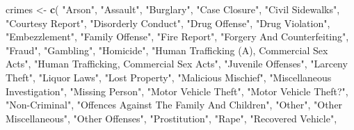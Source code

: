 \documentclass[
  12pt,
]{book}
\newenvironment{Shaded}{\begin{snugshade}}{\end{snugshade}}
\newcommand{\KeywordTok}[1]{\textcolor[rgb]{0.27,0.27,0.27}{\textbf{#1}}}
\newcommand{\NormalTok}[1]{#1}
\newcommand{\StringTok}[1]{\textcolor[rgb]{0.5,0.5,0.5}{#1}}
\begin{document}
\begin{Shaded}
\begin{Highlighting}[]
\NormalTok{crimes <{-}}\StringTok{ }\KeywordTok{c}\NormalTok{(}
  \StringTok{"Arson"}\NormalTok{,}
  \StringTok{"Assault"}\NormalTok{,                                  }
  \StringTok{"Burglary"}\NormalTok{,                                 }
  \StringTok{"Case Closure"}\NormalTok{,                             }
  \StringTok{"Civil Sidewalks"}\NormalTok{,                          }
  \StringTok{"Courtesy Report"}\NormalTok{,                          }
  \StringTok{"Disorderly Conduct"}\NormalTok{,                       }
  \StringTok{"Drug Offense"}\NormalTok{,                             }
  \StringTok{"Drug Violation"}\NormalTok{,                           }
  \StringTok{"Embezzlement"}\NormalTok{,                             }
  \StringTok{"Family Offense"}\NormalTok{,                           }
  \StringTok{"Fire Report"}\NormalTok{,                              }
  \StringTok{"Forgery And Counterfeiting"}\NormalTok{,               }
  \StringTok{"Fraud"}\NormalTok{,                                    }
  \StringTok{"Gambling"}\NormalTok{,                                 }
  \StringTok{"Homicide"}\NormalTok{,                                 }
  \StringTok{"Human Trafficking (A), Commercial Sex Acts"}\NormalTok{,}
  \StringTok{"Human Trafficking, Commercial Sex Acts"}\NormalTok{,   }
  \StringTok{"Juvenile Offenses"}\NormalTok{,                        }
  \StringTok{"Larceny Theft"}\NormalTok{,                            }
  \StringTok{"Liquor Laws"}\NormalTok{,                              }
  \StringTok{"Lost Property"}\NormalTok{,                            }
  \StringTok{"Malicious Mischief"}\NormalTok{,                       }
  \StringTok{"Miscellaneous Investigation"}\NormalTok{,              }
  \StringTok{"Missing Person"}\NormalTok{,                           }
  \StringTok{"Motor Vehicle Theft"}\NormalTok{,                      }
  \StringTok{"Motor Vehicle Theft?"}\NormalTok{,                     }
  \StringTok{"Non{-}Criminal"}\NormalTok{,                             }
  \StringTok{"Offences Against The Family And Children"}\NormalTok{, }
  \StringTok{"Other"}\NormalTok{,                                    }
  \StringTok{"Other Miscellaneous"}\NormalTok{,                      }
  \StringTok{"Other Offenses"}\NormalTok{,                           }
  \StringTok{"Prostitution"}\NormalTok{,                             }
  \StringTok{"Rape"}\NormalTok{,                                     }
  \StringTok{"Recovered Vehicle"}\NormalTok{,                        }

\end{Highlighting}
\end{Shaded}
\end{document}
